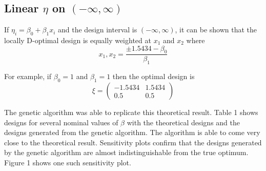 \documentclass[11pt,a4paper]{article}
\begin{document}
\subsection{Linear $\eta$ on $(-\infty, \infty)$}
If $\eta_i = \beta_0 + \beta_1 x_i$ and the design interval is $(-\infty, \infty)$, it can be shown that the locally D-optimal design is equally weighted at $x_1$ and $x_2$ where
$$
x_1, x_2 = \frac{\pm 1.5434 - \beta_0}{\beta_1}
$$

For example, if $\beta_0 = 1$ and $\beta_1 = 1$ then the optimal design is
$$
\xi = \begin{pmatrix}
-1.5434 & 1.5434\\ 0.5 & 0.5
\end{pmatrix}
$$

The genetic algorithm was able to replicate this theoretical result. Table 1 shows designs for several nominal values of $\beta$ with the theoretical designs and the designs generated from the genetic algorithm. The algorithm is able to come very close to the theoretical result. Sensitivity plots confirm that the designs generated by the genetic algorithm are almost indistinguishable from the true optimum. Figure 1 shows one such sensitivity plot.
\end{document}
